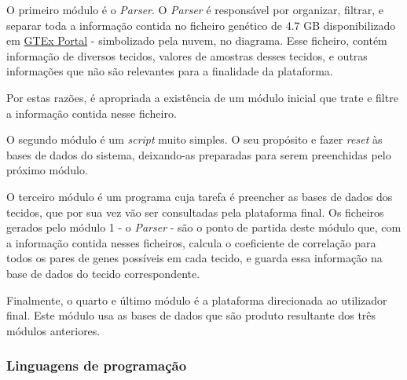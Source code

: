 \medskip

O primeiro módulo é o \textit{Parser}. O \textit{Parser} é responsável por organizar, filtrar, e separar toda a informação contida no ficheiro genético de 4.7 GB disponibilizado em \href{http://www.gtexportal.org/}{GTEx Portal} - simbolizado pela nuvem, no diagrama. Esse ficheiro, contém informação de diversos tecidos, valores de amostras desses tecidos, e outras informações que não são relevantes para a finalidade da plataforma.

Por estas razões, é apropriada a existência de um módulo inicial que trate e filtre a informação contida nesse ficheiro.

\bigskip

O segundo módulo é um \textit{script} muito simples. O seu propósito e fazer \textit{reset} às bases de dados do sistema, deixando-as preparadas para serem preenchidas pelo próximo módulo.

\bigskip

O terceiro módulo é um programa cuja tarefa é preencher as bases de dados dos tecidos, que por sua vez vão ser consultadas pela plataforma final. Os ficheiros gerados pelo módulo 1 - o \textit{Parser} - são o ponto de partida deste módulo que, com a informação contida nesses ficheiros, calcula o coeficiente de correlação para todos os pares de genes possíveis em cada tecido, e guarda essa informação na base de dados do tecido correspondente.

\bigskip

Finalmente, o quarto e último módulo é a plataforma direcionada ao utilizador final. Este módulo usa as bases de dados que são produto resultante dos três módulos anteriores.

\subsubsection{Linguagens de programação}

